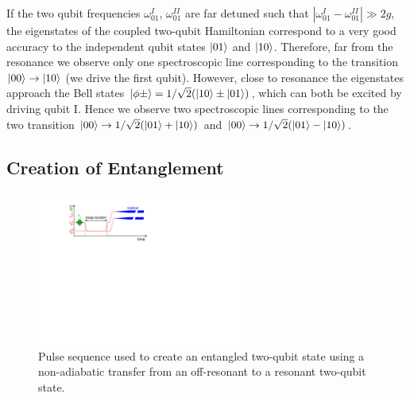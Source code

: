 If the two qubit frequencies $\omega_{01}^I$, $\omega_{01}^{II}$ are far detuned such that $|\omega_{01}^I-\omega_{01}^{II}|\gg 2g$, the eigenstates of the coupled two-qubit Hamiltonian correspond to a very good accuracy to the independent qubit states $\left| 01 \right>$ and $\left| 10 \right>$. Therefore, far from the resonance we observe only one spectroscopic line corresponding to the transition $\left| 00 \right>\to\left| 10 \right>$ (we drive the first qubit). However, close to resonance the eigenstates approach the Bell states $\left| \phi\pm \right> = 1/\sqrt{2}(\left| 10 \right>\pm\left| 01 \right>)$, which can both be excited by driving qubit I. Hence we observe two spectroscopic lines corresponding to the two transition $\left| 00 \right>\to 1/\sqrt{2}(\left| 01 \right>+\left| 10 \right>)$ and $\left| 00 \right>\to 1/\sqrt{2}(\left| 01 \right>-\left| 10 \right>)$.

\subsection{Creation of Entanglement}

\begin{figure}
	\centering
	\includegraphics[width=0.6\textwidth]{"./material/figures/measurement/qubit_swap"}
	\caption[Pulse sequence used to create an entangled two-qubit state]{Pulse sequence used to create an entangled two-qubit state using a non-adiabatic transfer from an off-resonant to a resonant two-qubit state.}
	\label{fig:qubit_swap_pulse_sequence}
\end{figure}

